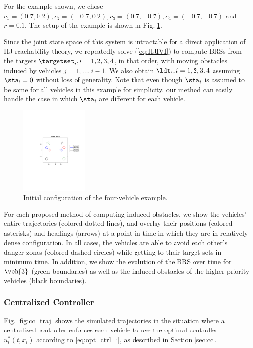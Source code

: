 \noindent For the example shown, we chose $c_1 = (0.7, 0.2), c_2 = (-0.7, 0.2), c_3 = (0.7, -0.7), c_4 = (-0.7, -0.7)$ and $r = 0.1$. The setup of the example is shown in Fig. \ref{fig:init_setup}.

Since the joint state space of this system is intractable for a direct application of HJ reachability theory, we repeatedly solve (\ref{eq:HJIVI}) to compute BRSs from the targets $\targetset_i, i =1,2,3,4$, in that order, with moving obstacles induced by vehicles $j=1,\ldots,i-1$. We also obtain $\ldt_i, i=1,2,3,4$ assuming $\sta_i=0$ without loss of generality. Note that even though $\sta_i$ is assumed to be same for all vehicles in this example for simplicity, our method can easily handle the case in which $\sta_i$ are different for each vehicle.

\begin{figure}
  \centering
  \includegraphics[width=0.30\textwidth]{"fig/init_setup"}
  \caption{Initial configuration of the four-vehicle example.}
  \label{fig:init_setup}
\end{figure}

For each proposed method of computing induced obstacles, we show the vehicles' entire trajectories (colored dotted lines), and overlay their positions (colored asterisks) and headings (arrows) at a point in time in which they are in relatively dense configuration. In all cases, the vehicles are able to avoid each other's danger zones (colored dashed circles) while getting to their target sets in minimum time. In addition, we show the evolution of the BRS over time for $\veh{3}$ (green boundaries) as well as the induced obstacles of the higher-priority vehicles (black boundaries).

\subsubsection{Centralized Controller}
Fig. \ref{fig:cc_traj} shows the simulated trajectories in the situation where a centralized controller enforces each vehicle to use the optimal controller $u^*_i(t, x_i)$ according to \eqref{eq:opt_ctrl_i}, as described in Section \ref{sec:cc}.

